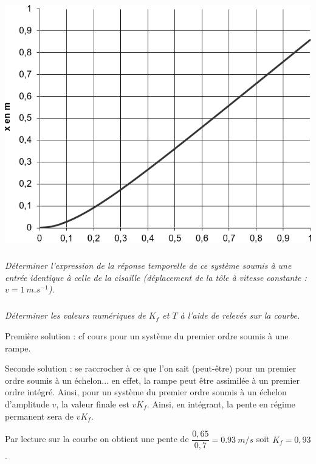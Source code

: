 \documentclass[10pt,fleqn]{article} %
\begin{document}
\begin{multicols}{2}
\begin{center}
\includegraphics[width=\linewidth]{images/fig_03}
\end{center}
\fi

\subparagraph{}\textit{Déterminer l'expression de la réponse temporelle de ce système soumis à une entrée identique à celle de la cisaille (déplacement de la tôle à vitesse constante : $v = \SI{1}{m.s^{-1}}$).}
\subparagraph{}\textit{Déterminer les valeurs numériques de $K_f$ et $T$ à l'aide de relevés sur la courbe.}
\ifprof \begin{corrige}

Première solution : cf cours pour un système du premier ordre soumis à une rampe. 

Seconde solution : se raccrocher à ce que l'on sait (peut-être) pour un premier ordre soumis à un échelon... en effet, la rampe peut être assimilée à un premier ordre intégré. Ainsi, pour un système du premier ordre soumis à un échelon d'amplitude $v$, la valeur finale est $vK_f$. Ainsi, en intégrant, la pente en régime permanent sera de $vK_f$. 

Par lecture sur la courbe on obtient une pente de $\dfrac{0,65}{0,7}=\SI{0,93}{m/s}$ soit $K_f=0,93$. 


\end{corrige}
\end{multicols}
\end{document}
